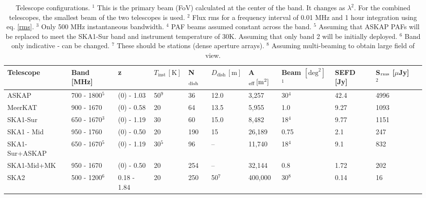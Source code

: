 \documentclass[useAMS,usenatbib]{mn2e}
\begin{document}
\begin{table}
\begin{center}
{\renewcommand{\arraystretch}{1.2} \begin{tabular}{ |l|l|l|l||l||l|l|l|l||l|l}
\hline
Telescope & Band [MHz] & z & $T_\mathrm{inst} \, [\mathrm{K}]$ & N$_{\rm dish}$ & $D_\mathrm{dish} \, [\mathrm{m}]$  & A$_{\rm eff}\, [\mathrm{m^2}]$ & Beam $[\mathrm{deg}^2]$ $^1$ & SEFD [Jy] &S$_{\rm rms}$ [$\mu$Jy] $^2$\\
 \hline
ASKAP & 700 - 1800$^5$ & (0) - 1.03 & 50$^9$ & 36 & 12.0 & 3,257 & 30$^4$ & 42.4 & 4996\\
MeerKAT & 900 - 1670 &  (0) - 0.58 & 20 & 64 & 13.5 & 5,955 & 1.0 & 9.27 & 1093\\
\hline
SKA1-Sur & 650 - 1670$^3$ & (0) - 1.19 & 30 & 60 & 15.0 & 8,482 & 18$^4$ & 9.77 & 1151\\
 SKA1 - Mid & 950 - 1760 & (0) - 0.50 & 20 & 190 & 15 & 26,189 & 0.75 & 2.1 & 247\\
SKA1-Sur+ASKAP & 650 - 1670$^5$ & (0) - 1.19 & 30$^5$ & 96 & -- & 11,740 & 18$^4$ & 9.1 & 832\\
SKA1-Mid+MK & 950 - 1670 & (0) - 0.50 & 20 & 254 & -- & 32,144 & 0.8 & 1.72 & 202\\


\hline
SKA2 & 500 - 1200$^6$ & 0.18 - 1.84 & 20 & 250 & 50$^7$ & 400,000 & 30$^8$ & 0.14 & 16\\  
\hline
\end{tabular} }
\end{center}
\label{tab:telescopes}
\vspace{-1.4em}\caption{Telescope configurations.
$^1$ This is the primary beam (FoV) calculated at the center of the band. It changes as $\lambda^2$. For the combined telescopes, the smallest beam of the two telescopes is used.
$^2$ Flux rms for a frequency interval of 0.01 MHz and 1 hour integration using eq. \ref{rms}.
$^3$ Only 500 MHz instantaneous bandwidth.
$^4$ PAF beams assumed constant across the band.
$^5$ Assuming that ASKAP PAFs will be replaced to meet the SKA1-Sur band and instrument temperature of 30K. Assuming that only band 2 will be initially deployed.
$^6$ Band only indicative - can be changed.
$^7$ These should be stations (dense aperture arrays).
$^8$ Assuming multi-beaming to obtain large field of view.}
\end{table}
\end{document}
